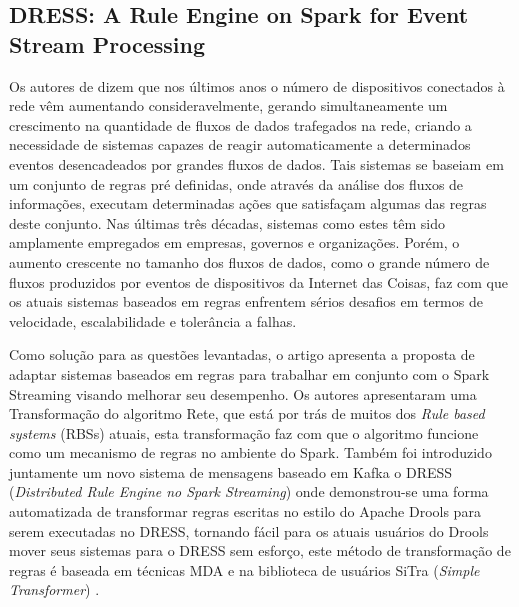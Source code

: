 \documentclass[ti,table]{texufpel} %
\begin{document}
  

  

\subsection{DRESS: A Rule Engine on Spark for Event Stream Processing} 

  

  

    Os autores de \cite{art5chen2016dress} dizem que nos últimos anos o número de dispositivos conectados à rede vêm aumentando consideravelmente, gerando simultaneamente um crescimento na quantidade de fluxos de dados trafegados na rede, criando a necessidade de sistemas capazes de reagir automaticamente a determinados eventos desencadeados por grandes fluxos de dados. Tais sistemas se baseiam em um conjunto de regras pré definidas, onde através da análise dos fluxos de informações, executam determinadas ações que satisfaçam algumas das regras deste conjunto. Nas últimas três décadas, sistemas como estes têm sido amplamente empregados em empresas, governos e organizações. Porém, o aumento crescente no tamanho dos fluxos de dados, como o grande número de fluxos produzidos por eventos de dispositivos da Internet das Coisas, faz com que os atuais sistemas baseados em regras enfrentem sérios desafios em termos de velocidade, escalabilidade e tolerância a falhas. 

     

    Como solução para as questões levantadas, o artigo apresenta a proposta de adaptar sistemas baseados em regras para trabalhar em conjunto com o Spark Streaming visando melhorar seu desempenho. Os autores apresentaram uma Transformação do algoritmo Rete, que está por trás de muitos dos \textit{Rule based systems} (RBSs) atuais, esta transformação faz com que o algoritmo funcione como um mecanismo de regras no ambiente do Spark. Também foi introduzido juntamente um novo sistema de mensagens baseado em Kafka o DRESS (\textit{Distributed Rule Engine no Spark Streaming}) onde demonstrou-se uma forma automatizada de transformar regras escritas no estilo do Apache Drools para serem executadas no DRESS, tornando fácil para os atuais usuários do Drools mover seus sistemas para o DRESS sem esforço, este método de transformação de regras é baseada em técnicas MDA e na biblioteca de usuários SiTra (\textit{Simple Transformer})  \cite{art5chen2016dress} . 

     
\end{document}
